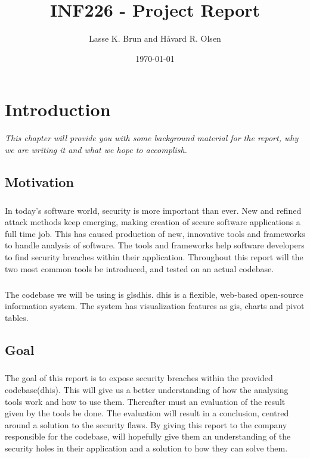 \documentclass[11pt,english,a4paper]{report}
\title{INF226 - Project Report}
\date{\today}
\author{Lasse K. Brun and Håvard R. Olsen}
\begin{document}
\maketitle

\tableofcontents
\newpage

\printglossaries
\newpage


\chapter{Introduction}
\textit{This chapter will provide you with some background material for the report, why we are writing it and what we hope to accomplish.}

\section{Motivation}
\paragraph{}
In today's software world, security is more important than ever. 
New and refined attack methods keep emerging, making creation of secure software applications a full time job. 
This has caused production of new, innovative tools and frameworks to handle analysis of software. 
The tools and frameworks help software developers to find security breaches within their application. 
Throughout this report will the two most common tools be introduced, and tested on an actual codebase.

\paragraph{}
The codebase we will be using is gls{dhis}. \gls{dhis} is a flexible, web-based open-source information system. 
The system has visualization features as \gls{gis}, charts and pivot tables. 


\section{Goal}
\paragraph{}
The goal of this report is to expose security breaches within the provided codebase(\gls{dhis}). 
This will give us a better understanding of how the analysing tools work and how to use them. 
Thereafter must an evaluation of the result given by the tools be done. 
The evaluation will result in a conclusion, centred around a solution to the security flaws. 
By giving this report to the company responsible for the codebase, will hopefully give them an understanding of the security holes in their application and a solution to how they can solve them.
\end{document}
